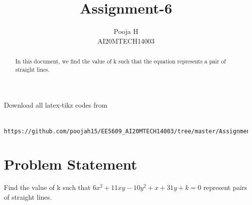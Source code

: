 \documentclass[journal,12pt,twocolumn]{IEEEtran}
\begin{document}
	\makeatother
	\let\StandardTheFigure\thefigure
	\let\vec\mathbf
	\renewcommand{\thefigure}{\theproblem}
	\def\putbox#1#2#3{\makebox[0in][l]{\makebox[#1][l]{}\raisebox{\baselineskip}[0in][0in]{\raisebox{#2}[0in][0in]{#3}}}}
	\def\rightbox#1{\makebox[0in][r]{#1}}
	\def\centbox#1{\makebox[0in]{#1}}
	\def\topbox#1{\raisebox{-\baselineskip}[0in][0in]{#1}}
	\def\midbox#1{\raisebox{-0.5\baselineskip}[0in][0in]{#1}}
	\vspace{3cm}
	\title{Assignment-6}
	\author{Pooja H \\ AI20MTECH14003}
	\maketitle
	\newpage
	\bigskip
	\renewcommand{\thefigure}{\theenumi}
	\renewcommand{\thetable}{\theenumi}
\begin{abstract}
	In this document, we find the value of k such that the equation represents a pair of straight lines.
\end{abstract}
Download all latex-tikz codes from 
\begin{lstlisting}
	https://github.com/poojah15/EE5609_AI20MTECH14003/tree/master/Assignment_6
\end{lstlisting}
\section{Problem Statement}
Find the value of k such that $6x^2 + 11xy - 10y^2 + x + 31y + k =0$ represent pairs of straight lines.
\end{document}
